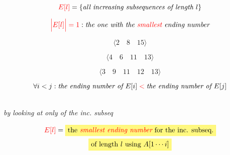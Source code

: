 \begin{frame}{}
  \[
    \textcolor{red}{E[l]} = \left\{\text{\it all increasing subsequences of length $l$}\right\}
  \]

  \[
    \textcolor{red}{\Big|E[l]\Big| = 1}: \text{\it the one with the \textcolor{red}{\it smallest} ending number}
  \]

  \pause
  \[
    \langle 2\quad 8\quad 15 \rangle
  \]
  
  \[
    \langle 4\quad 6\quad 11\quad 13 \rangle
  \]

  \[
    \langle 3\quad 9\quad 11\quad 12\quad 13 \rangle
  \]

  \pause
  \[
    \forall i < j: \text{\it the ending number of } E[i] \;\textcolor{red}{<}\; \text{\it the ending number of } E[j]
  \]
\end{frame}

\begin{frame}{}
  
\end{frame}

\begin{frame}{}
  \begin{center}
    {\Large \it {}} \\[6pt] \pause
    {\large \it by looking at only  of the inc. subseq}
  \end{center}

  \pause
  \begin{gather*}
    \red{E[l]} = \hl{yellow}{\text{the \red{\it smallest ending number} for the inc. subseq.}} \\
      \hl{yellow}{\text{of length $l$ using $A[1 \cdots i]$}}
  \end{gather*}
\end{frame}

\begin{frame}{}
  
\end{frame}

\begin{frame}{}
\end{frame}
